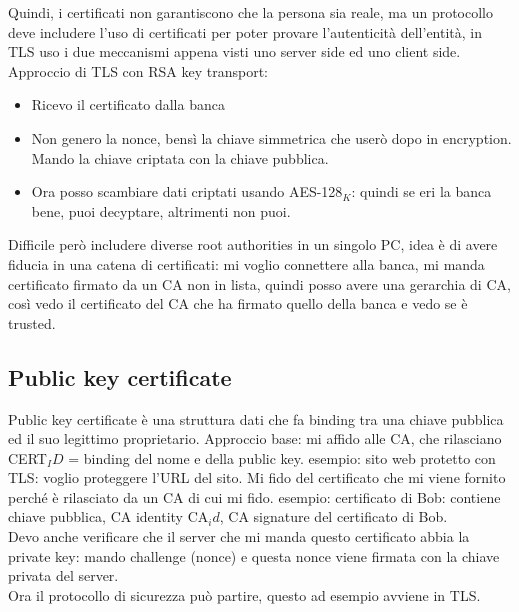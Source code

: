 \documentclass[16px]{article}
\begin{document}
Quindi, i certificati non garantiscono che la persona sia reale, ma un protocollo deve includere l'uso di certificati per poter provare l'autenticità dell'entità, in TLS uso i due meccanismi appena visti uno server side ed uno client side.\\ Approccio di TLS con RSA key transport:
\begin{itemize}
\item Ricevo il certificato dalla banca
\item Non genero la nonce, bensì la chiave simmetrica che userò dopo in encryption. Mando la chiave criptata con la chiave pubblica.
\item Ora posso scambiare dati criptati usando AES-128$_{K}$: quindi se eri la banca bene, puoi decyptare, altrimenti non puoi.
\end{itemize}
Difficile però includere diverse root authorities in un singolo PC, idea è di avere fiducia in una catena di certificati: mi voglio connettere alla banca, mi manda certificato firmato da un CA non in lista, quindi posso avere una gerarchia di CA, così vedo il certificato del CA che ha firmato quello della banca e vedo se è trusted.
\subsection{Public key certificate}
Public key certificate è una struttura dati che fa binding tra una chiave pubblica ed il suo legittimo proprietario. Approccio base: mi affido alle CA, che rilasciano CERT$_ID$ = binding del nome e della public key. esempio: sito web protetto con TLS: voglio proteggere l'URL del sito. Mi fido del certificato che mi viene fornito perché è rilasciato da un CA di cui mi fido. esempio: certificato di Bob: contiene chiave pubblica, CA identity CA$_id$, CA signature del certificato di Bob.\\ Devo anche verificare che il server che mi manda questo certificato abbia la private key: mando challenge (nonce) e questa nonce viene firmata con la chiave privata del server.\\ Ora il protocollo di sicurezza può partire, questo ad esempio avviene in TLS.
\end{document}
